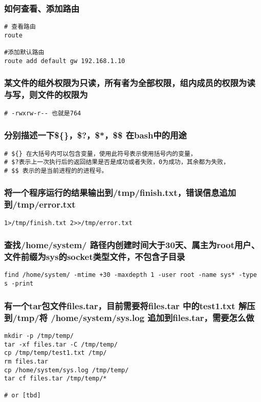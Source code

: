 \documentclass{article}
\begin{document}
\subsubsection{如何查看、添加路由}
\begin{verbatim}
# 查看路由
route 

#添加默认路由
route add default gw 192.168.1.10
\end{verbatim}

\subsubsection{某文件的组外权限为只读，所有者为全部权限，组内成员的权限为读与写，则文件的权限为}
\begin{verbatim}
# -rwxrw-r-- 也就是764
\end{verbatim}

\subsubsection{分别描述一下\$\{\}，\$?，\$*，\$\$ 在bash中的用途}
\begin{verbatim}
# ${} 在大括号内可以包含变量，使用此符号表示使用括号内的变量，
# $?表示上一次执行后的返回结果是否是成功或者失败，0为成功，其余都为失败，
# $$ 表示的是当前进程的的进程号。
\end{verbatim}

\subsubsection{将一个程序运行的结果输出到/tmp/finish.txt，错误信息追加到/tmp/error.txt}
\begin{verbatim}
1>/tmp/finish.txt 2>>/tmp/error.txt
\end{verbatim}

\subsubsection{查找/home/system/ 路径内创建时间大于30天、属主为root用户、文件前缀为sys的socket类型文件，不包含子目录}
\begin{verbatim}
find /home/system/ -mtime +30 -maxdepth 1 -user root -name sys* -type s -print
\end{verbatim}

\subsubsection{有一个tar包文件files.tar，目前需要将files.tar 中的test1.txt 解压到/tmp/将 /home/system/sys.log 追加到files.tar，需要怎么做}
\begin{verbatim}
mkdir -p /tmp/temp/
tar -xf files.tar -C /tmp/temp/
cp /tmp/temp/test1.txt /tmp/
rm files.tar
cp /home/system/sys.log /tmp/temp/
tar cf files.tar /tmp/temp/*

# or [tbd]

\end{verbatim}
\end{document}
